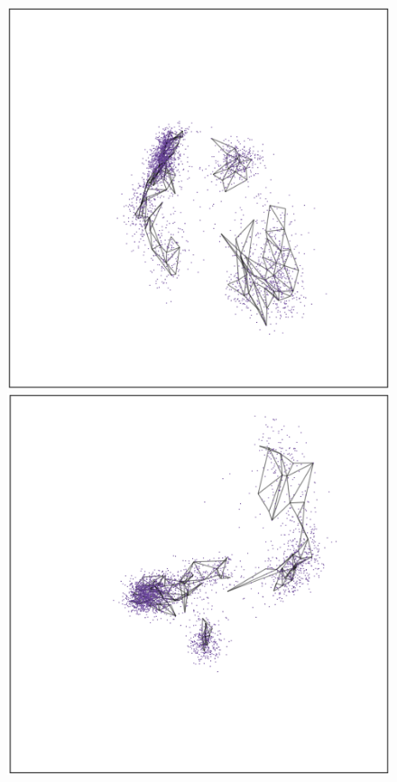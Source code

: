 \documentclass[
  12pt]{article}
\begin{document}
\begin{figure}[H]

\begin{minipage}{0.33\linewidth}
\includegraphics{figures/pbmc3k/sc_1.png}\end{minipage}%
%
\begin{minipage}{0.33\linewidth}
\includegraphics{figures/pbmc3k/sc_2.png}\end{minipage}%

\end{figure}
\end{document}
